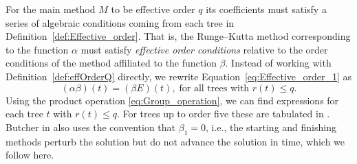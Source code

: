 \indent For the main method $M$ to be effective order $q$ its coefficients must satisfy a series of algebraic conditions coming from each tree in Definition~\ref{def:Effective_order}. That is, the Runge--Kutta method corresponding to the function $\alpha$ must satisfy \emph{effective order conditions} relative to the order conditions of the method affiliated to the function $\beta$. Instead of working with Definition~\ref{def:effOrderQ} directly, we rewrite Equation~\eqref{eq:Effective_order_1} as 
\begin{equation}\label{eq:Effective_order_2}
	(\alpha\beta)(t) = (\beta E)(t), \; \text{for all trees with $r(t) \leq q$.}
\end{equation}
Using the product operation \eqref{eq:Group_operation}, we can find expressions for each tree $t$ with $r(t) \leq q$.  For trees up to order five these are tabulated in \cite[Table~3.89]{Butcher2008_book}.
Butcher in \cite{Butcher2008_book} also uses the convention that $\beta_1 = 0$, i.e., the starting and finishing methods perturb the solution but do not advance the solution in time, which we follow here.
